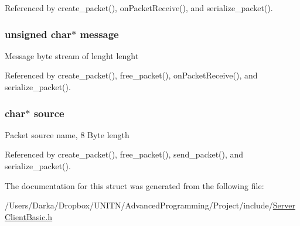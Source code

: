 Referenced by create\+\_\+packet(), on\+Packet\+Receive(), and serialize\+\_\+packet().

\subsubsection[{\texorpdfstring{message}{message}}]{\setlength{\rightskip}{0pt plus 5cm}unsigned char$\ast$ message}\hypertarget{structpacket__basic__t_abb13456032cf48eaa794391b6ed937c7}{}\label{structpacket__basic__t_abb13456032cf48eaa794391b6ed937c7}
Message byte stream of lenght lenght 

Referenced by create\+\_\+packet(), free\+\_\+packet(), on\+Packet\+Receive(), and serialize\+\_\+packet().

\subsubsection[{\texorpdfstring{source}{source}}]{\setlength{\rightskip}{0pt plus 5cm}char$\ast$ source}\hypertarget{structpacket__basic__t_aee6937c81d468a0915308234d09d212c}{}\label{structpacket__basic__t_aee6937c81d468a0915308234d09d212c}
Packet source name, 8 Byte length 

Referenced by create\+\_\+packet(), free\+\_\+packet(), send\+\_\+packet(), and serialize\+\_\+packet().



The documentation for this struct was generated from the following file\+:\begin{DoxyCompactItemize}
\item 
/\+Users/\+Darka/\+Dropbox/\+U\+N\+I\+T\+N/\+Advanced\+Programming/\+Project/include/\hyperlink{_server_client_basic_8h}{Server\+Client\+Basic.\+h}\end{DoxyCompactItemize}
